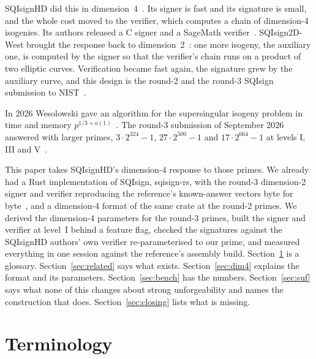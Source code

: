\documentclass[11pt]{article}
\begin{document}
SQIsignHD did this in dimension~4~\cite{DLRW24}.  Its signer is fast and
its signature is small, and the whole cost moved to the verifier, which
computes a chain of dimension-4 isogenies.  Its authors released a C
signer and a SageMath verifier~\cite{SQISignHDlib}.  SQIsign2D-West brought
the response back to dimension~2~\cite{BDDF24}: one more isogeny, the
auxiliary one, is computed by the signer so that the verifier's chain
runs on a product of two elliptic curves.  Verification became fast again,
the signature grew by the auxiliary curve, and this design is the round-2
and the round-3 SQIsign submission to NIST~\cite{SQISignV2,SQISignV3}.

In 2026 Wesolowski gave an algorithm for the supersingular isogeny problem
in time and memory $p^{1/3+o(1)}$~\cite{Wes26}.  The round-3 submission of
September 2026 answered with larger primes,
$3 \cdot 2^{324} - 1$, $27 \cdot 2^{500} - 1$ and $17 \cdot 2^{664} - 1$
at levels I, III and V~\cite{SQISignV3}.

This paper takes SQIsignHD's dimension-4 response to those primes.  We
already had a Rust implementation of SQIsign, sqisign-rs, with the round-3
dimension-2 signer and verifier reproducing the reference's known-answer
vectors byte for byte~\cite{SqisignRs}, and a dimension-4 format of the
same crate at the round-2 primes.  We derived the dimension-4 parameters
for the round-3 primes, built the signer and verifier at level~I behind a
feature flag, checked the signatures against the SQIsignHD authors' own
verifier re-parameterised to our prime, and measured everything in one
session against the reference's assembly build.  Section~\ref{sec:terms}
is a glossary.  Section~\ref{sec:related} says what exists.
Section~\ref{sec:dim4} explains the format and its parameters.
Section~\ref{sec:bench} has the numbers.  Section~\ref{sec:suf} says what
none of this changes about strong unforgeability and names the
construction that does.  Section~\ref{sec:closing} lists what is missing.

\section{Terminology}
\label{sec:terms}
\end{document}
